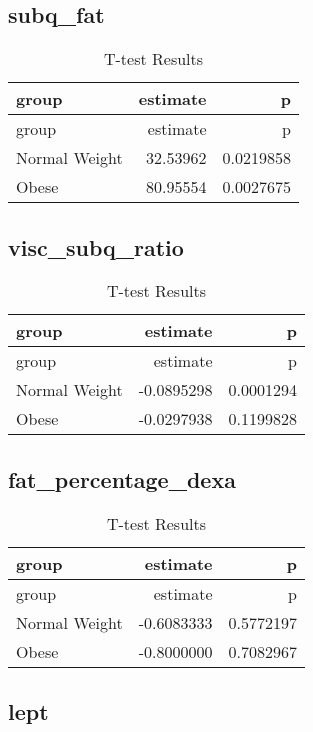 \documentclass[
]{article}
\begin{document}
\hypertarget{subq_fat-2}{%
\subsection{subq\_fat}\label{subq_fat-2}}

\begin{longtable}[]{@{}lrr@{}}
\caption{T-test Results}\tabularnewline
\toprule()
group & estimate & p \\
\midrule()
\endfirsthead
\toprule()
group & estimate & p \\
\midrule()
\endhead
Normal Weight & 32.53962 & 0.0219858 \\
Obese & 80.95554 & 0.0027675 \\
\bottomrule()
\end{longtable}

\hypertarget{visc_subq_ratio-2}{%
\subsection{visc\_subq\_ratio}\label{visc_subq_ratio-2}}

\begin{longtable}[]{@{}lrr@{}}
\caption{T-test Results}\tabularnewline
\toprule()
group & estimate & p \\
\midrule()
\endfirsthead
\toprule()
group & estimate & p \\
\midrule()
\endhead
Normal Weight & -0.0895298 & 0.0001294 \\
Obese & -0.0297938 & 0.1199828 \\
\bottomrule()
\end{longtable}

\hypertarget{fat_percentage_dexa-2}{%
\subsection{fat\_percentage\_dexa}\label{fat_percentage_dexa-2}}

\begin{longtable}[]{@{}lrr@{}}
\caption{T-test Results}\tabularnewline
\toprule()
group & estimate & p \\
\midrule()
\endfirsthead
\toprule()
group & estimate & p \\
\midrule()
\endhead
Normal Weight & -0.6083333 & 0.5772197 \\
Obese & -0.8000000 & 0.7082967 \\
\bottomrule()
\end{longtable}

\hypertarget{lept-2}{%
\subsection{lept}\label{lept-2}}
\end{document}
